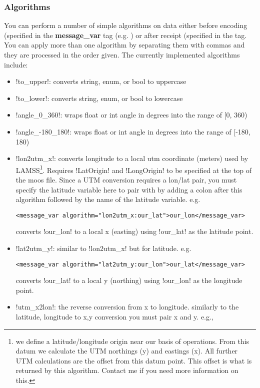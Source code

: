 \subsubsection{Algorithms}
You can perform a number of simple algorithms on data either before encoding (specified in the \textbf{message\_var} tag (e.g. ) or after receipt (specified in the  tag. You can apply more than one algorithm by separating them with commas and they are processed in the order given. The currently implemented algorithms include:
\begin{itemize}
\item !to_upper!: converts string, enum, or bool to uppercase
\item !to_lower!: converts string, enum, or bool to lowercase
\item !angle_0_360!: wraps float or int angle in degrees into the range of [0, 360)
\item !angle_-180_180!: wraps float or int angle in degrees into the range of [-180, 180)
\item !lon2utm_x!: converts longitude to a local utm coordinate (meters) used by LAMSS\footnote{we define a latitude/longitude origin near our basis of operations. From this datum we calculate the UTM northings (y) and eastings (x). All further UTM calculations are the offset from this datum point. This offset is what is returned by this algorithm. Contact me if you need more information on this.}. Requires !LatOrigin! and !LongOrigin! to be specified at the top of the moos file. Since a UTM conversion requires a lon/lat pair, you must specify the latitude variable here to pair with by adding a colon after this algorithm followed by the name of the latitude variable. e.g.
\begin{verbatim}
<message_var algorithm="lon2utm_x:our_lat">our_lon</message_var>
\end{verbatim}
converts !our_lon! to a local x (easting) using !our_lat! as the latitude point.
\item !lat2utm_y!: similar to !lon2utm_x! but for latitude. e.g. 
\begin{verbatim}
<message_var algorithm="lat2utm_y:our_lon">our_lat</message_var>
\end{verbatim}
converts !our_lat! to a local y (northing) using !our_lon! as the longitude point.
\item !utm_x2lon!: the reverse conversion from x to longitude. similarly to the latitude, longitude to x,y conversion you must pair x and y. e.g., 

\end{itemize}
